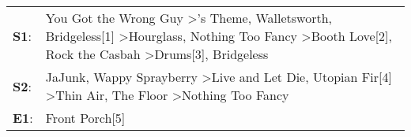 \begin{supertabular}{p{0.03\textwidth}p{0.92\textwidth}}
 \textbf{S1}:  &  You Got the Wrong Guy\textsuperscript{} \textgreater {}'s Theme\textsuperscript{}, \enspace Walletsworth\textsuperscript{}, \enspace Bridgeless[1]\textsuperscript{} \textgreater \enspace Hourglass\textsuperscript{}, \enspace Nothing Too Fancy\textsuperscript{} \textgreater \enspace Booth Love[2]\textsuperscript{}, \enspace Rock the Casbah\textsuperscript{} \textgreater \enspace Drums[3]\textsuperscript{}, \enspace Bridgeless\textsuperscript{}  \enspace  \\
 \textbf{S2}:  &                                                                                                                                               JaJunk\textsuperscript{}, \enspace Wappy Sprayberry\textsuperscript{} \textgreater \enspace Live and Let Die\textsuperscript{}, \enspace Utopian Fir[4]\textsuperscript{} \textgreater \enspace Thin Air\textsuperscript{}, \enspace The Floor\textsuperscript{} \textgreater \enspace Nothing Too Fancy\textsuperscript{}  \enspace  \\
 \textbf{E1}:  &                                                                                                                                                                                                                                                                                                                                                                                                                                         Front Porch[5]\textsuperscript{}  \enspace  \\
\end{supertabular}
